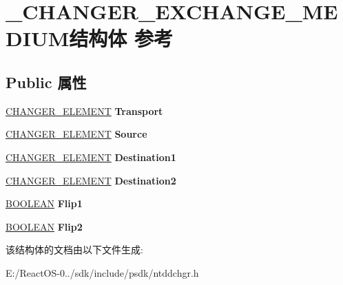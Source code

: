 \hypertarget{struct___c_h_a_n_g_e_r___e_x_c_h_a_n_g_e___m_e_d_i_u_m}{}\section{\+\_\+\+C\+H\+A\+N\+G\+E\+R\+\_\+\+E\+X\+C\+H\+A\+N\+G\+E\+\_\+\+M\+E\+D\+I\+U\+M结构体 参考}
\label{struct___c_h_a_n_g_e_r___e_x_c_h_a_n_g_e___m_e_d_i_u_m}
\subsection*{Public 属性}
\begin{DoxyCompactItemize}
\item 
\mbox{\label{struct___c_h_a_n_g_e_r___e_x_c_h_a_n_g_e___m_e_d_i_u_m_a24c3e072ed9d5dc9e52dcbacf2935baf}} 
\hyperlink{struct___c_h_a_n_g_e_r___e_l_e_m_e_n_t}{C\+H\+A\+N\+G\+E\+R\+\_\+\+E\+L\+E\+M\+E\+NT} {\bfseries Transport}
\item 
\mbox{\label{struct___c_h_a_n_g_e_r___e_x_c_h_a_n_g_e___m_e_d_i_u_m_ab0d59c3600f8950be5b4edeab6256bbe}} 
\hyperlink{struct___c_h_a_n_g_e_r___e_l_e_m_e_n_t}{C\+H\+A\+N\+G\+E\+R\+\_\+\+E\+L\+E\+M\+E\+NT} {\bfseries Source}
\item 
\mbox{\label{struct___c_h_a_n_g_e_r___e_x_c_h_a_n_g_e___m_e_d_i_u_m_a352080715147cb7390cf798ce3d80f07}} 
\hyperlink{struct___c_h_a_n_g_e_r___e_l_e_m_e_n_t}{C\+H\+A\+N\+G\+E\+R\+\_\+\+E\+L\+E\+M\+E\+NT} {\bfseries Destination1}
\item 
\mbox{\label{struct___c_h_a_n_g_e_r___e_x_c_h_a_n_g_e___m_e_d_i_u_m_a2b86f684736421966f19922983aa18ae}} 
\hyperlink{struct___c_h_a_n_g_e_r___e_l_e_m_e_n_t}{C\+H\+A\+N\+G\+E\+R\+\_\+\+E\+L\+E\+M\+E\+NT} {\bfseries Destination2}
\item 
\mbox{\label{struct___c_h_a_n_g_e_r___e_x_c_h_a_n_g_e___m_e_d_i_u_m_a270b8cef4319c71ddc443a33be9c95b5}} 
\hyperlink{_processor_bind_8h_a112e3146cb38b6ee95e64d85842e380a}{B\+O\+O\+L\+E\+AN} {\bfseries Flip1}
\item 
\mbox{\label{struct___c_h_a_n_g_e_r___e_x_c_h_a_n_g_e___m_e_d_i_u_m_a43da5d7e35148a2452ff50f18b3b8e2b}} 
\hyperlink{_processor_bind_8h_a112e3146cb38b6ee95e64d85842e380a}{B\+O\+O\+L\+E\+AN} {\bfseries Flip2}
\end{DoxyCompactItemize}


该结构体的文档由以下文件生成\+:\begin{DoxyCompactItemize}
\item 
E\+:/\+React\+O\+S-\/0../sdk/include/psdk/ntddchgr.\+h\end{DoxyCompactItemize}
